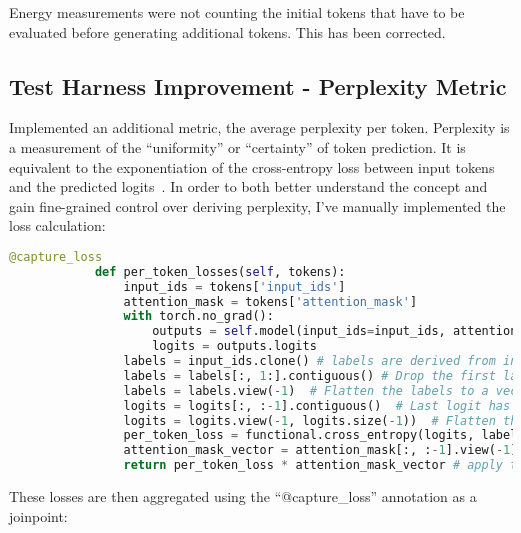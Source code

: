 \documentclass{article}
\begin{document}
    Energy measurements were not counting the initial tokens that have to be evaluated before generating additional tokens.
    This has been corrected.

    \subsection{Test Harness Improvement - Perplexity Metric}\label{subsec:perplexity}
    Implemented an additional metric, the average perplexity per token.
    Perplexity is a measurement of the ``uniformity'' or ``certainty'' of token prediction.
    It is equivalent to the exponentiation of the cross-entropy loss between input tokens and the predicted logits~\cite{jelinek1977perplexity}.
    In order to both better understand the concept and gain fine-grained control over deriving perplexity, I've manually implemented the loss calculation:
    \\
    \begin{lstlisting}[language=Python,label={lst:lstlisting}]
            @capture_loss
            def per_token_losses(self, tokens):
                input_ids = tokens['input_ids']
                attention_mask = tokens['attention_mask']
                with torch.no_grad():
                    outputs = self.model(input_ids=input_ids, attention_mask=attention_mask)
                    logits = outputs.logits
                labels = input_ids.clone() # labels are derived from input
                labels = labels[:, 1:].contiguous() # Drop the first label - it isn't useful as no logits are generated for it
                labels = labels.view(-1)  # Flatten the labels to a vector, [batch_size * labels_sequence_length], in preperation for cross_entroy calculation
                logits = logits[:, :-1].contiguous()  # Last logit has no label to compare with
                logits = logits.view(-1, logits.size(-1))  # Flatten the logits to a matrix [batch_size * sequence_length, vocab_size]
                per_token_loss = functional.cross_entropy(logits, labels, reduction='none') # vector of per token losses
                attention_mask_vector = attention_mask[:, :-1].view(-1).contiguous()
                return per_token_loss * attention_mask_vector # apply the attention mask to remove padding, which can skew perplexity measurements
    \end{lstlisting}

    These losses are then aggregated using the ``@capture\_loss'' annotation as a joinpoint:
\end{document}
